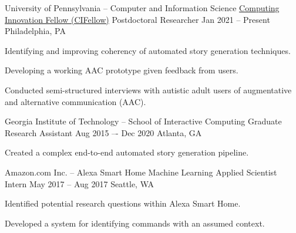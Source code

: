 {\color{black}\fontsize{12pt}{1em}} 


\begin{cventries}

  \cventry
    {University of Pennsylvania -- Computer and Information Science} %
    {\href{https://cifellows2020.org/}{Computing Innovation Fellow (CIFellow)} Postdoctoral Researcher} %
    {Jan 2021 -- Present} %
    {Philadelphia, PA} %
    {
      \begin{cvitems} %
      \item {Identifying and improving coherency of automated story generation techniques.}
      \item {Developing a working AAC prototype given feedback from users.}
      \item {Conducted semi-structured interviews with autistic adult users of augmentative and alternative communication (AAC).}
      \end{cvitems}
    }
  \cventry
    {Georgia Institute of Technology -- School of Interactive Computing} %
    {Graduate Research Assistant} %
    {Aug 2015 –- Dec 2020} %
    {Atlanta, GA} %
    {
      \begin{cvitems} %
        \item {Created a complex end-to-end automated story generation pipeline.}
      \end{cvitems}
    }

  \cventry
    {Amazon.com Inc. -- Alexa Smart Home Machine Learning} %
    {Applied Scientist Intern} %
    {May 2017 – Aug 2017} %
    {Seattle, WA} %
    {
      \begin{cvitems} %
        \item {Identified potential research questions within Alexa Smart Home.}
        \item {Developed a system for identifying commands with an assumed context.}
      \end{cvitems}
    }


\end{cventries}
